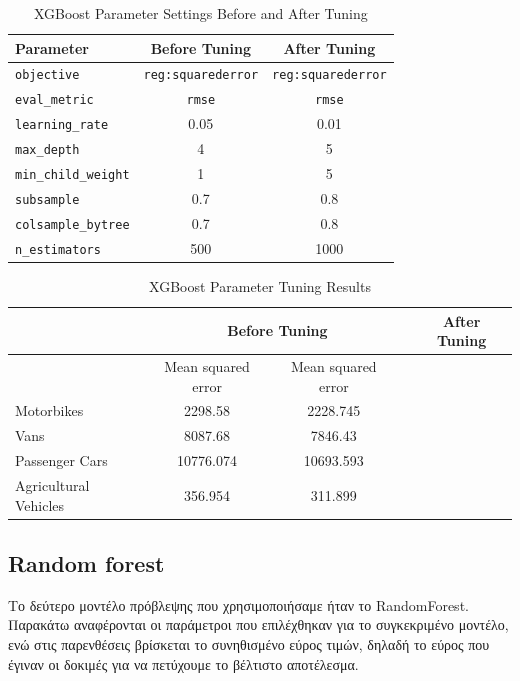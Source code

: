 \documentclass{llncs}
\begin{document}
\begin{table}[h!]
    \centering
    \begin{tabular}{l|cc}
        \hline
        Parameter & Before Tuning & After Tuning \\
        \hline
        \texttt{objective} & \texttt{reg:squarederror} & \texttt{reg:squarederror} \\
        \texttt{eval\_metric} & \texttt{rmse} & \texttt{rmse} \\
        \texttt{learning\_rate} & 0.05 & 0.01 \\
        \texttt{max\_depth} & 4 & 5 \\
        \texttt{min\_child\_weight} & 1 & 5 \\
        \texttt{subsample} & 0.7 & 0.8 \\
        \texttt{colsample\_bytree} & 0.7 & 0.8 \\
        \texttt{n\_estimators} & 500 & 1000 \\
        \hline
    \end{tabular}
    \caption{XGBoost Parameter Settings Before and After Tuning}
\end{table}

\begin{table}[h!]
    \centering
    \begin{tabular}{lccc|ccc}
        \hline
        & \multicolumn{3}{c}{Before Tuning} & \multicolumn{3}{c}{After Tuning} \\
        \hline
        & Mean squared error & Mean squared error \\
        \hline
        Motorbikes & 2298.58 & 2228.745  \\
        Vans & 8087.68 & 7846.43 \\
        Passenger Cars & 10776.074  & 10693.593 \\
        Agricultural Vehicles & 356.954 & 311.899\\
        \hline
    \end{tabular}
    \caption{XGBoost Parameter Tuning Results}
\end{table}

\subsection{Random forest}
Το δεύτερο μοντέλο πρόβλεψης που χρησιμοποιήσαμε ήταν το RandomForest. Παρακάτω αναφέρονται οι παράμετροι που επιλέχθηκαν για το συγκεκριμένο μοντέλο, ενώ στις παρενθέσεις βρίσκεται το συνηθισμένο εύρος τιμών, δηλαδή το εύρος που έγιναν οι δοκιμές για να πετύχουμε το βέλτιστο αποτέλεσμα.\\
\end{document}
